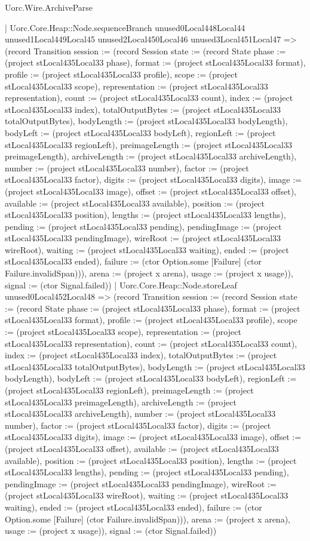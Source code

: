 \begin{lexlean}{Uorc.Wire.ArchiveParse}
\begin{semanticmodule}
{        | Uorc.Core.Heap::Node.sequenceBranch unused0Local448Local44 unused1Local449Local45 unused2Local450Local46 unused3Local451Local47 => (record Transition {session := (record Session {state := (record State {phase := (project stLocal435Local33 phase), format := (project stLocal435Local33 format), profile := (project stLocal435Local33 profile), scope := (project stLocal435Local33 scope), representation := (project stLocal435Local33 representation), count := (project stLocal435Local33 count), index := (project stLocal435Local33 index), totalOutputBytes := (project stLocal435Local33 totalOutputBytes), bodyLength := (project stLocal435Local33 bodyLength), bodyLeft := (project stLocal435Local33 bodyLeft), regionLeft := (project stLocal435Local33 regionLeft), preimageLength := (project stLocal435Local33 preimageLength), archiveLength := (project stLocal435Local33 archiveLength), number := (project stLocal435Local33 number), factor := (project stLocal435Local33 factor), digits := (project stLocal435Local33 digits), image := (project stLocal435Local33 image), offset := (project stLocal435Local33 offset), available := (project stLocal435Local33 available), position := (project stLocal435Local33 position), lengths := (project stLocal435Local33 lengths), pending := (project stLocal435Local33 pending), pendingImage := (project stLocal435Local33 pendingImage), wireRoot := (project stLocal435Local33 wireRoot), waiting := (project stLocal435Local33 waiting), ended := (project stLocal435Local33 ended), failure := (ctor Option.some [Failure] (ctor Failure.invalidSpan))}), arena := (project x arena), usage := (project x usage)}), signal := (ctor Signal.failed)})
        | Uorc.Core.Heap::Node.storeLeaf unused0Local452Local48 => (record Transition {session := (record Session {state := (record State {phase := (project stLocal435Local33 phase), format := (project stLocal435Local33 format), profile := (project stLocal435Local33 profile), scope := (project stLocal435Local33 scope), representation := (project stLocal435Local33 representation), count := (project stLocal435Local33 count), index := (project stLocal435Local33 index), totalOutputBytes := (project stLocal435Local33 totalOutputBytes), bodyLength := (project stLocal435Local33 bodyLength), bodyLeft := (project stLocal435Local33 bodyLeft), regionLeft := (project stLocal435Local33 regionLeft), preimageLength := (project stLocal435Local33 preimageLength), archiveLength := (project stLocal435Local33 archiveLength), number := (project stLocal435Local33 number), factor := (project stLocal435Local33 factor), digits := (project stLocal435Local33 digits), image := (project stLocal435Local33 image), offset := (project stLocal435Local33 offset), available := (project stLocal435Local33 available), position := (project stLocal435Local33 position), lengths := (project stLocal435Local33 lengths), pending := (project stLocal435Local33 pending), pendingImage := (project stLocal435Local33 pendingImage), wireRoot := (project stLocal435Local33 wireRoot), waiting := (project stLocal435Local33 waiting), ended := (project stLocal435Local33 ended), failure := (ctor Option.some [Failure] (ctor Failure.invalidSpan))}), arena := (project x arena), usage := (project x usage)}), signal := (ctor Signal.failed)})
}
\end{semanticmodule}
\end{lexlean}
